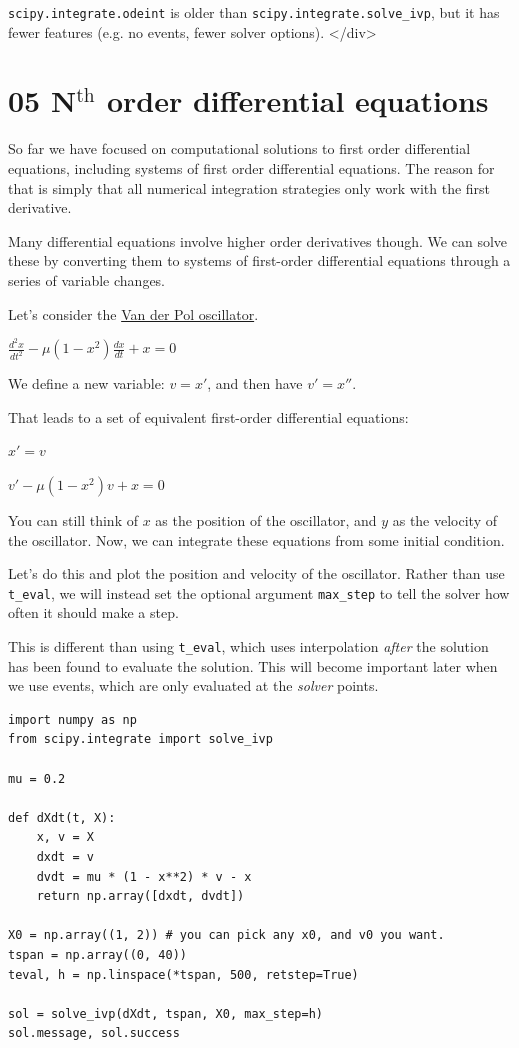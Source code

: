 \documentclass[11pt]{article}
\begin{document}
\texttt{scipy.integrate.odeint} is older than \texttt{scipy.integrate.solve\_ivp}, but it has fewer features (e.g. no events, fewer solver options).
</div>

\section{05 N\(^{\text{th}}\) order differential equations}
\label{sec:orgb75f823}
So far we have focused on computational solutions to first order differential equations, including systems of first order differential equations. The reason for that is simply that all numerical integration strategies only work with the first derivative.

Many differential equations involve higher order derivatives though. We can solve these by converting them to systems of first-order differential equations through a series of variable changes.

Let's consider the \href{https://en.wikipedia.org/wiki/Van\_der\_Pol\_oscillator}{Van der Pol oscillator}.

\(\frac{d^2x}{dt^2} - \mu(1-x^2)\frac{dx}{dt} + x = 0\)

We define a new variable: \(v = x'\), and then have \(v' = x''\).

That leads to a set of equivalent first-order differential equations:

\(x' = v\)

\(v' - \mu (1-x^2)v + x = 0\)

You can still think of \(x\) as the position of the oscillator, and \(y\) as the velocity of the oscillator. Now, we can integrate these equations from some initial condition.

Let's do this and plot the position and velocity of the oscillator. Rather than use \texttt{t\_eval}, we will instead set the optional argument \texttt{max\_step} to tell the solver how often it should make a step.

This is different than using \texttt{t\_eval}, which uses interpolation \emph{after} the solution has been found to evaluate the solution. This will become important later when we use events, which are only evaluated at the \emph{solver} points.

\begin{verbatim}
import numpy as np
from scipy.integrate import solve_ivp

mu = 0.2

def dXdt(t, X):
    x, v = X
    dxdt = v
    dvdt = mu * (1 - x**2) * v - x
    return np.array([dxdt, dvdt])

X0 = np.array((1, 2)) # you can pick any x0, and v0 you want.
tspan = np.array((0, 40))
teval, h = np.linspace(*tspan, 500, retstep=True)

sol = solve_ivp(dXdt, tspan, X0, max_step=h)
sol.message, sol.success
\end{verbatim}
\end{document}

